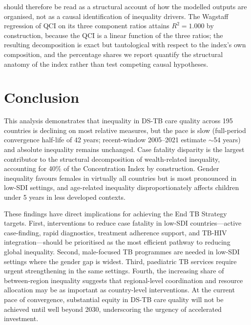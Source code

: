 \documentclass[12pt]{article}
\begin{document}
should therefore be read as a structural account of how the modelled outputs are organised, not as a causal identification of inequality drivers. The Wagstaff regression of QCI on its three component ratios attains $R^2 = 1.000$ by construction, because the QCI is a linear function of the three ratios; the resulting decomposition is exact but tautological with respect to the index's own composition, and the percentage shares we report quantify the structural anatomy of the index rather than test competing causal hypotheses.


\section{Conclusion}

This analysis demonstrates that inequality in DS-TB care quality across 195 countries is declining on most relative measures, but the pace is slow (full-period convergence half-life of 42 years; recent-window 2005--2021 estimate $\sim$54 years) and absolute inequality remains unchanged. Case fatality disparity is the largest contributor to the structural decomposition of wealth-related inequality, accounting for 40\% of the Concentration Index by construction. Gender inequality favours females in virtually all countries but is most pronounced in low-SDI settings, and age-related inequality disproportionately affects children under 5 years in less developed contexts.

These findings have direct implications for achieving the End TB Strategy targets. First, interventions to reduce case fatality in low-SDI countries---active case-finding, rapid diagnostics, treatment adherence support, and TB-HIV integration---should be prioritised as the most efficient pathway to reducing global inequality. Second, male-focused TB programmes are needed in low-SDI settings where the gender gap is widest. Third, paediatric TB services require urgent strengthening in the same settings. Fourth, the increasing share of between-region inequality suggests that regional-level coordination and resource allocation may be as important as country-level interventions. At the current pace of convergence, substantial equity in DS-TB care quality will not be achieved until well beyond 2030, underscoring the urgency of accelerated investment.

\end{document}
